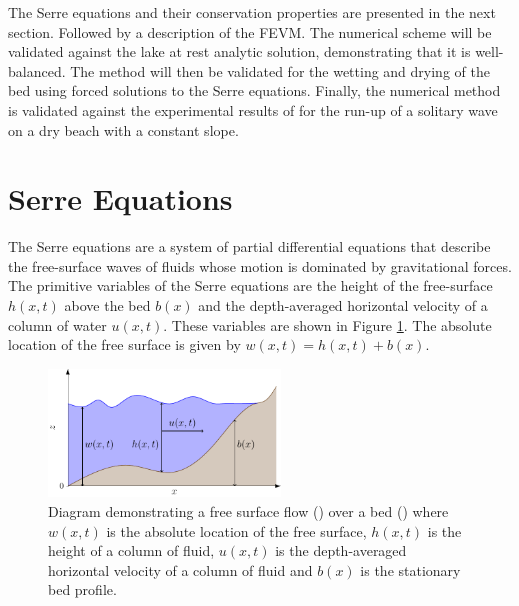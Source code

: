 \documentclass[times]{elsarticle}
\DeclareRobustCommand{\squareF}[1]{\tikz{\filldraw[#1,fill opacity= 0.3] (0,0) rectangle (0.2cm,0.2cm);}}
\begin{document}
The Serre equations and their conservation properties are presented in the next section. Followed by a description of the FEVM. The numerical scheme will be validated against the lake at rest analytic solution, demonstrating that it is well-balanced. The method will then be validated for the wetting and drying of the bed using forced solutions to the Serre equations. Finally, the numerical method is validated against the experimental results of \citet{Synolakis-1987-523} for the run-up of a solitary wave on a dry beach with a constant slope.

\section{Serre Equations}
The Serre equations \cite{Seabra-Santos-etal-1987-117} are a system of partial differential equations that describe the free-surface waves of fluids whose motion is dominated by gravitational forces. The primitive variables of the Serre equations are the height of the free-surface $h(x,t)$ above the bed $b(x)$ and the depth-averaged horizontal velocity of a column of water $u(x,t)$. These variables are shown in Figure \ref{fig:SerreModel}. The absolute location of the free surface is given by $w(x,t) = h(x,t) + b(x)$.
\begin{figure}
	\centering
	\includegraphics[width=0.55\textwidth]{./Figures/Diagrams/Watermodel/SerreModel.pdf}
	\caption{Diagram demonstrating a free surface flow (\squareF{blue}) over a bed (\squareF{brown!80!black}) where $w(x,t)$ is the absolute location of the free surface, $h(x,t)$ is the height of a column of fluid, $u(x,t)$ is the depth-averaged horizontal velocity of a column of fluid and $b(x)$ is the stationary bed profile.}
	\label{fig:SerreModel}
\end{figure}
\end{document}

